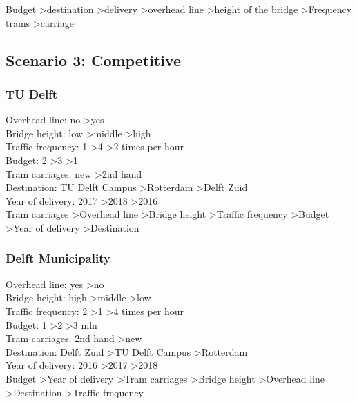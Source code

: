 \documentclass{article}
\begin{document}
Budget \textgreater destination \textgreater delivery \textgreater overhead line \textgreater height of the bridge \textgreater Frequency trams \textgreater carriage\\

\subsection{Scenario 3: Competitive}
\subsubsection{TU Delft}
Overhead line: no \textgreater yes \\
Bridge height: low \textgreater middle \textgreater high \\
Traffic frequency: 1 \textgreater 4 \textgreater 2 times per hour \\
Budget: 2 \textgreater 3 \textgreater 1 \\
Tram carriages: new \textgreater 2nd hand \\
Destination: TU Delft Campus \textgreater Rotterdam \textgreater Delft Zuid \\
Year of delivery: 2017 \textgreater 2018 \textgreater 2016 \\

Tram carriages \textgreater Overhead line \textgreater Bridge height \textgreater Traffic frequency \textgreater Budget \textgreater Year of delivery \textgreater Destination\\


\subsubsection{Delft Municipality}
Overhead line: yes \textgreater no \\
Bridge height: high \textgreater middle \textgreater low \\
Traffic frequency: 2 \textgreater 1 \textgreater 4 times per hour \\
Budget: 1 \textgreater 2 \textgreater 3 mln \\
Tram carriages: 2nd hand \textgreater new \\
Destination: Delft Zuid \textgreater TU Delft Campus \textgreater Rotterdam \\
Year of delivery: 2016 \textgreater 2017 \textgreater 2018 \\

Budget \textgreater Year of delivery \textgreater Tram carriages \textgreater Bridge height \textgreater Overhead line \textgreater Destination \textgreater Traffic frequency\\
\end{document}
